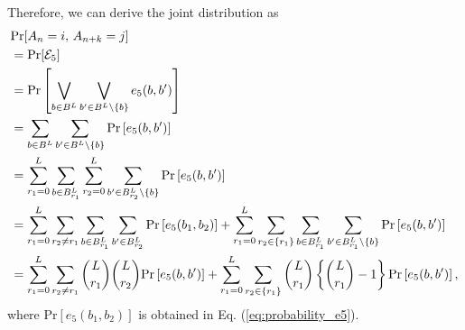 \documentclass[dvipdfmx,english]{ampmt} %
\begin{document}
%
Therefore, we can derive the joint distribution as
\begin{align}\label{eq:joint_dist_5}
\begin{split}
  &\mathrm{Pr} [A_n=i,\, A_{n+k}=j] \\
  &=\mathrm{Pr} [\mathcal{E}_5] \\
  &= \mathrm{Pr} \left[ \bigvee_{b \in B^L} \bigvee_{b^\prime \in B^L \setminus \{b\}}
  e_5(b,b^\prime) \right] \\
  &=\sum_{b \in B^L} \sum_{b^\prime \in B^{L} \setminus \{ b \}} \mathrm{Pr} \left[ e_5(b,b^\prime) \right] \\
  &= \sum_{r_1=0}^{L} \sum_{b \in B^L_{r_1}} \sum_{r_2=0}^{L} \sum_{b^\prime \in B^L_{r_2} \setminus \{ b \}} \mathrm{Pr} \left[ e_5(b,b^\prime) \right] \\
  &= \sum_{r_1=0}^{L} \sum_{r_2 \neq r_1} \sum_{b \in B^L_{r_1}} \sum_{b^\prime \in B^L_{r_2}} \mathrm{Pr} \left[e_5(b_1,b_2) \right] 
  + \sum_{r_1=0}^{L} \sum_{r_2 \in \{r_1\}} \sum_{b \in B^L_{r_1}} \sum_{b^\prime \in B^L_{r_1} \setminus \{ b \}} \mathrm{Pr} \left[e_5(b,b^\prime) \right] \\
  &= \sum_{r_1=0}^{L} \sum_{r_2 \neq r_1} \dbinom{L}{r_1} \dbinom{L}{r_2} \mathrm{Pr} \left[e_5(b,b^\prime) \right] 
  + \sum_{r_1=0}^{L}\sum_{r_2\in\{r_1\}} \dbinom{L}{r_1} \left\{ \dbinom{L}{r_1} -1 \right\} \mathrm{Pr} \left[e_5(b,b^\prime) \right],
\end{split}
\end{align}
where $\mathrm{Pr} \left[e_5(b_1,b_2) \right]$ is obtained in Eq. (\ref{eq:probability_e5}).
\end{document}
